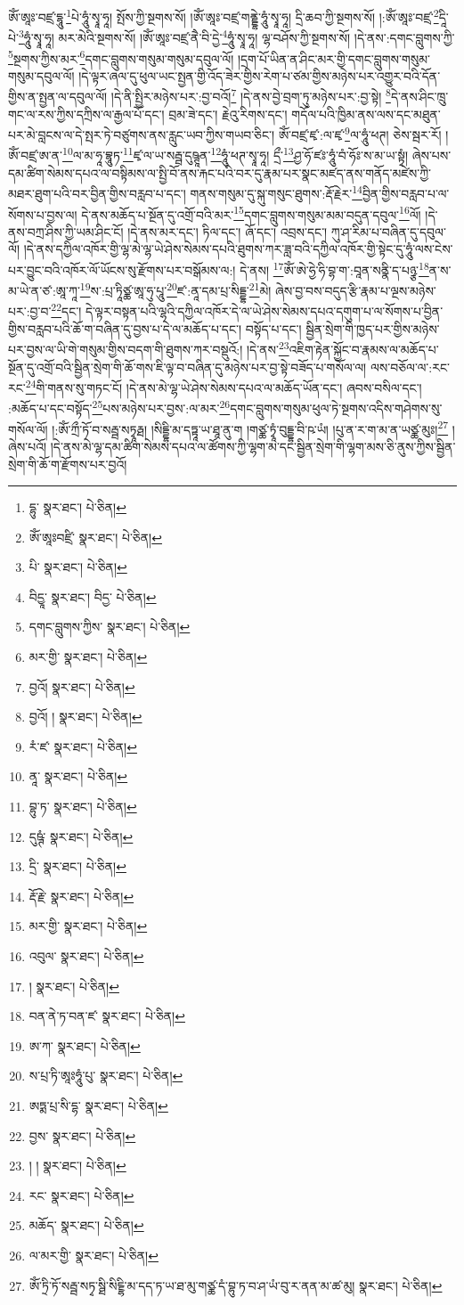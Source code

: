ཨོཾ་ཨཱཿ་བཛྲ་དྷཱུ་\footnote{དྷུ་  སྣར་ཐང་།  པེ་ཅིན། }པེ་ཧཱུཾ་སྭཱ་ཧཱ། སྤོས་ཀྱི་སྔགས་སོ། །ཨོཾ་ཨཱཿ་བཛྲ་གནྡྷེ་ཧཱུཾ་སྭཱ་ཧཱ། དྲི་ཆབ་ཀྱི་སྔགས་སོ། །:ཨོཾ་ཨཱཿ་བཛྲ་\footnote{ཨོཾ་ཨཱཿབཛྲི་  སྣར་ཐང་།  པེ་ཅིན། }དཱི་པེ་\footnote{པི་  སྣར་ཐང་།  པེ་ཅིན། }ཧཱུཾ་སྭཱ་ཧཱ། མར་མེའི་སྔགས་སོ། །ཨོཾ་ཨཱཿ་བཛྲ་ནཻ་བི་དྱེ་\footnote{བིདྱཱ་  སྣར་ཐང་། བིདྱ་  པེ་ཅིན། }ཧཱུཾ་སྭཱ་ཧཱ། ལྷ་བཤོས་ཀྱི་སྔགས་སོ། །དེ་ནས་:དགང་བླུགས་ཀྱི་\footnote{དགང་བླུགས་ཀྱིས་  སྣར་ཐང་།  པེ་ཅིན། }སྔགས་ཀྱིས་མར་\footnote{མར་གྱི་  སྣར་ཐང་།  པེ་ཅིན། }དགང་བླུགས་གསུམ་གསུམ་དབུལ་ལོ། །དྲག་པོ་ཡིན་ན་ཤིང་མར་གྱི་དགང་བླུགས་གསུམ་གསུམ་དབུལ་ལོ། །དེ་ལྟར་ཞལ་དུ་ཕུལ་ཡང་སྤྱན་གྱི་འོད་ཟེར་གྱིས་རེག་པ་ཙམ་གྱིས་མཉེས་པར་འགྱུར་བའི་དོན་གྱིས་ན་སྤྱན་ལ་དབུལ་ལོ། །དེ་ནི་སྤྱིར་མཉེས་པར་:བྱ་བའོ།\footnote{བྱའོ།  སྣར་ཐང་།  པེ་ཅིན། } །དེ་ནས་བྱེ་བྲག་ཏུ་མཉེས་པར་:བྱ་སྟེ། \footnote{བྱའོ། །   སྣར་ཐང་།  པེ་ཅིན། }དེ་ནས་ཤིང་ཁྲུ་གང་ལ་རས་ཀྱིས་དཀྲིས་ལ་རྒྱལ་པོ་དང་། བྲམ་ཟེ་དང་། རྗེའུ་རིགས་དང་། གདོལ་པའི་ཁྱིམ་ནས་ལས་དང་མཐུན་པར་མེ་བླངས་ལ་དེ་སྤར་ཏེ་བཙུགས་ནས་རླུང་ཡབ་ཀྱིས་གཡབ་ཅིང་། ཨོཾ་བཛྲ་ཛྭ་:ལ་ཛྭ་\footnote{རཾ་ཛ་  སྣར་ཐང་།  པེ་ཅིན། }ལ་ཧཱུཾ་ཕཊ། ཅེས་སྦར་རོ། །ཨོཾ་བཛྲ་ཨ་ན་\footnote{ནཱ་  སྣར་ཐང་།  པེ་ཅིན། }ལ་མ་ཧཱ་བྷཱུཏ་\footnote{བྷུ་ཏ་  སྣར་ཐང་།  པེ་ཅིན། }ཛྭ་ལ་ཡ་སརྦྦ་དུཥྚཱན་\footnote{དུཥྚཾ་  སྣར་ཐང་།  པེ་ཅིན། }ཧཱུཾ་ཕཊ་སྭཱ་ཧཱ། དྲྀ་\footnote{དྲི་  སྣར་ཐང་།  པེ་ཅིན། }ཤྱ་ཧོ་ཛཿ་ཧཱུཾ་བཾ་ཧོཿ་ས་མ་ཡ་སྟྭཾ། ཞེས་པས་དམ་ཚིག་སེམས་དཔའ་ལ་བསྟིམས་ལ་སྤྱི་བོ་ནས་རྐང་པའི་བར་དུ་རྣམ་པར་སྣང་མཛད་ནས་གནོད་མཛེས་ཀྱི་མཐར་ཐུག་པའི་བར་བྱིན་གྱིས་བརླབ་པ་དང་། གནས་གསུམ་དུ་སྐུ་གསུང་ཐུགས་:རྡོ་རྗེར་\footnote{རྡོ་རྗེ་  སྣར་ཐང་།  པེ་ཅིན། }བྱིན་གྱིས་བརླབ་པ་ལ་སོགས་པ་བྱས་ལ། དེ་ནས་མཆོད་པ་སྔོན་དུ་འགྲོ་བའི་མར་\footnote{མར་གྱི་  སྣར་ཐང་།  པེ་ཅིན། }དགང་བླུགས་གསུམ་མམ་བདུན་དབུལ་\footnote{འབུལ་  སྣར་ཐང་།  པེ་ཅིན། }ལོ། །དེ་ནས་བཀྲ་ཤིས་ཀྱི་ཡམ་ཤིང་ངོ། །དེ་ནས་མར་དང་། ཏིལ་དང་། ཞོ་དང་། འབྲས་དང་། ཀུ་ཤ་རིམ་པ་བཞིན་དུ་དབུལ་ལོ། །དེ་ནས་དཀྱིལ་འཁོར་གྱི་ལྷ་མེ་ལྷ་ཡེ་ཤེས་སེམས་དཔའི་ཐུགས་ཀར་ཟླ་བའི་དཀྱིལ་འཁོར་གྱི་སྟེང་དུ་ཧཱུཾ་ལས་ངེས་པར་བྱུང་བའི་འཁོར་ལོ་ཡོངས་སུ་རྫོགས་པར་བསྒོམས་ལ:། དེ་ནས། \footnote{།    སྣར་ཐང་།  པེ་ཅིན། }ཨོཾ་ཨེ་ཧྱེ་ཧི་བྷ་ག་:བཱན་སནྣི་ད་པཉྩ་\footnote{བན་ནེ་ཏ་བན་ཛ་  སྣར་ཐང་།  པེ་ཅིན། }ན་ས་མ་ཡེ་ན་ཙ་:ཨཱ་ཀཱ་\footnote{ཨ་ཀ་  སྣར་ཐང་།  པེ་ཅིན། }ས་:པྲ་ཏཱིཙྪ་ཨཱ་ཧུ་པཱུ་\footnote{ས་པྲ་ཏི་ཨཱཿཧཱུཾ་པུ་  སྣར་ཐང་།  པེ་ཅིན། }ཛ་:ནཱ་དམ་པྲ་སིདྡྷ་\footnote{ཨཏྨ་པྲ་སི་དྷ་  སྣར་ཐང་།  པེ་ཅིན། }མེ། ཞེས་བྱ་བས་བདུད་རྩི་རྣམ་པ་ལྔས་མཉེས་པར་:བྱ་བ་\footnote{བྱས་  སྣར་ཐང་།  པེ་ཅིན། }དང་། དེ་ལྟར་བསྟན་པའི་ལྷའི་དཀྱིལ་འཁོར་དེ་ལ་ཡེ་ཤེས་སེམས་དཔའ་དགུག་པ་ལ་སོགས་པ་བྱིན་གྱིས་བརླབ་པའི་ཆོ་ག་བཞིན་དུ་བྱས་པ་དེ་ལ་མཆོད་པ་དང་། བསྟོད་པ་དང་། སྦྱིན་སྲེག་གི་ཁྱད་པར་གྱིས་མཉེས་པར་བྱས་ལ་ཡི་གེ་གསུམ་གྱིས་བདག་གི་ཐུགས་ཀར་བསྡུའོ:། །དེ་ནས་\footnote{། །  སྣར་ཐང་།  པེ་ཅིན། }འཇིག་རྟེན་སྐྱོང་བ་རྣམས་ལ་མཆོད་པ་སྔོན་དུ་འགྲོ་བའི་སྦྱིན་སྲེག་གི་ཆོ་གས་ཇི་ལྟ་བ་བཞིན་དུ་མཉེས་པར་བྱ་སྟེ་བཟོད་པ་གསོལ་ལ། ལས་བཅོལ་ལ་:རང་རང་\footnote{རང་  སྣར་ཐང་།  པེ་ཅིན། }གི་གནས་སུ་གཏང་ངོ། །དེ་ནས་མེ་ལྷ་ཡེ་ཤེས་སེམས་དཔའ་ལ་མཆོད་ཡོན་དང་། ཞབས་བསིལ་དང་། :མཆོད་པ་དང་བསྟོད་\footnote{མཆོད་  སྣར་ཐང་།  པེ་ཅིན། }པས་མཉེས་པར་བྱས་:ལ་མར་\footnote{ལ་མར་གྱི་  སྣར་ཐང་།  པེ་ཅིན། }དགང་བླུགས་གསུམ་ཕུལ་ཏེ་སྔགས་འདིས་གཤེགས་སུ་གསོལ་ལོ། །:ཨོཾ་ཀྲྀ་ཏོ་བ་སརྦྦ་སཏྭཱརྠ། །སིདྡྷི་མ་དཏྟཱ་ཡ་ཐཱ་ནུ་ག །གཙྪ་ཏྭཱཾ་བུདྡྷ་བི་ཥ་ཡཾ། །པུ་ན་ར་ག་མ་ན་ཡཙྪ་མུཿ།\footnote{ཨོཾ་ཏྲི་ཏོ་སརྦྦ་སཏྭ་སྠི་སིངྔྷི་མ་དད་ཏ་ཡ་ཐ་མུ་གཙྪ་དཾ་བྷུ་ཏ་བ་ཤ་ཡཾ་བུ་ར་ནན་མ་ཚ་མུ།  སྣར་ཐང་།  པེ་ཅིན། } །ཞེས་པའོ། །དེ་ནས་མེ་ལྷ་དམ་ཚིག་སེམས་དཔའ་ལ་ཚོགས་ཀྱི་ལྷག་མ་དང་སྦྱིན་སྲེག་གི་ལྷག་མས་ཅི་ནུས་ཀྱིས་སྦྱིན་སྲེག་གི་ཆོ་ག་རྫོགས་པར་བྱའོ། 